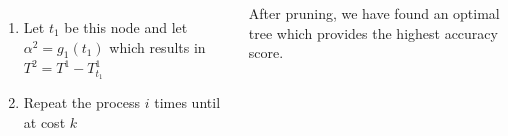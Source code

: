 \documentclass[12pt, a2paper, landscape]{tikzposter}
\begin{document}
\begin{columns}
{\begin{enumerate}
        \item Let $t_1$ be this node and let $\alpha^2 = g_1 (t_1)$ which results in $T^2 = T^1 - T_{t_1}^1$
    
        \item Repeat the process $i$ times until at cost $k$
    \end{enumerate}
    After pruning, we have found an optimal tree which provides the highest accuracy score.
 }
 
 \block{}{
 
 }
 
 
 

 
\end{columns}




\end{document}
